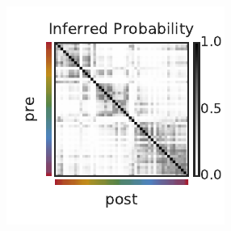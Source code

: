 \begin{figure}[t!]
\begin{center}
\begin{subfigure}[T]{1.8in}
      \label{fig:hipp_W}
    \end{subfigure}
    \begin{subfigure}[T]{1.8in}
      \caption{}
      \vspace{-2em}
      \includegraphics[width=\textwidth]{figures/ch3/hipp_P} 
      \label{fig:hipp_P}
    \end{subfigure}
    \\
    \vspace{-1em}
    \begin{subfigure}[T]{1.4in}
      \caption{}
      \vspace{-1em}

\end{subfigure}
\end{center}
\end{figure}
